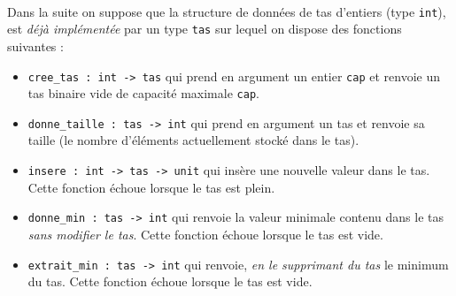 \documentclass[11pt,a4paper]{article}
\begin{document}
\begin{Exercise}[title = {Recherche des $k$ premiers maximums d'une liste}]
	\ExePart[name = {Résolution en utilisant un tas}]\\
	Dans la suite on suppose que la structure de données de tas d'entiers (type {\tt int}), est \textit{déjà implémentée} par un type {\tt tas} sur lequel on dispose des fonctions suivantes :
	\begin{itemize}
		\item {\tt cree\_tas : int -> tas} qui prend en argument un entier {\tt cap} et renvoie un tas binaire vide de capacité maximale {\tt cap}.
		\item {\tt donne\_taille : tas -> int} qui prend en argument un tas et renvoie sa taille (le nombre d'éléments actuellement stocké dans le tas).
		\item {\tt insere : int -> tas -> unit} qui insère une nouvelle valeur dans le tas. Cette fonction échoue lorsque le tas est plein.
		\item {\tt donne\_min : tas -> int} qui renvoie la valeur minimale contenu dans le tas  \textit{sans modifier le tas}. Cette fonction échoue lorsque le tas est vide.
		\item {\tt extrait\_min : tas -> int} qui renvoie, \textit{en le supprimant du tas} le minimum du tas. Cette fonction échoue lorsque le tas est vide.
	\end{itemize}
	\medskip


\end{Exercise}
\end{document}
